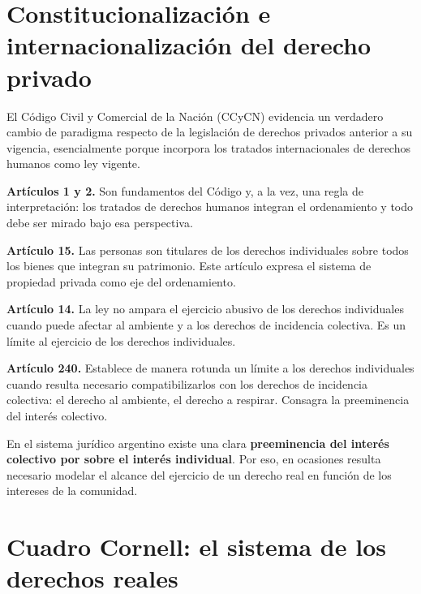 \documentclass[12pt,oneside]{book}
\begin{document}
\section{Constitucionalización e internacionalización del derecho privado}

El Código Civil y Comercial de la Nación (CCyCN) evidencia un verdadero cambio de paradigma respecto de la legislación de derechos privados anterior a su vigencia, esencialmente porque incorpora los tratados internacionales de derechos humanos como ley vigente.

\textbf{Artículos 1 y 2.} Son fundamentos del Código y, a la vez, una regla de interpretación: los tratados de derechos humanos integran el ordenamiento y todo debe ser mirado bajo esa perspectiva.

\textbf{Artículo 15.} Las personas son titulares de los derechos individuales sobre todos los bienes que integran su patrimonio. Este artículo expresa el sistema de propiedad privada como eje del ordenamiento.

\textbf{Artículo 14.} La ley no ampara el ejercicio abusivo de los derechos individuales cuando puede afectar al ambiente y a los derechos de incidencia colectiva. Es un límite al ejercicio de los derechos individuales.

\textbf{Artículo 240.} Establece de manera rotunda un límite a los derechos individuales cuando resulta necesario compatibilizarlos con los derechos de incidencia colectiva: el derecho al ambiente, el derecho a respirar. Consagra la preeminencia del interés colectivo.

\begin{important}
En el sistema jurídico argentino existe una clara \textbf{preeminencia del interés colectivo por sobre el interés individual}. Por eso, en ocasiones resulta necesario modelar el alcance del ejercicio de un derecho real en función de los intereses de la comunidad.
\end{important}

\section{Cuadro Cornell: el sistema de los derechos reales}

\end{document}
